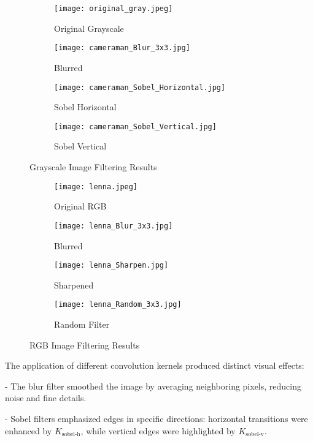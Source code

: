 \documentclass[12pt,a4paper]{article}
\begin{document}
	\begin{figure}[h]
		\centering
		\begin{subfigure}{0.49\linewidth}
			\texttt{[image: original\_gray.jpeg]}
			\caption{Original Grayscale}
		\end{subfigure}
		\begin{subfigure}{0.49\linewidth}
			\texttt{[image: cameraman\_Blur\_3x3.jpg]}
			\caption{Blurred}
		\end{subfigure}
		\begin{subfigure}{0.49\linewidth}
			\texttt{[image: cameraman\_Sobel\_Horizontal.jpg]}
			\caption{Sobel Horizontal}
		\end{subfigure}
		\begin{subfigure}{0.49\linewidth}
			\texttt{[image: cameraman\_Sobel\_Vertical.jpg]}
			\caption{Sobel Vertical}
		\end{subfigure}
		\caption{Grayscale Image Filtering Results}
		\label{fig:original_gray}
	\end{figure}
	\newpage
	\begin{figure}[h]
		\centering
		\begin{subfigure}{0.49\linewidth}
			\texttt{[image: lenna.jpeg]}
			\caption{Original RGB}
		\end{subfigure}
		\begin{subfigure}{0.49\linewidth}
			\texttt{[image: lenna\_Blur\_3x3.jpg]}
			\caption{Blurred}
		\end{subfigure}
		\begin{subfigure}{0.49\linewidth}
			\texttt{[image: lenna\_Sharpen.jpg]}
			\caption{Sharpened}
		\end{subfigure}
		\begin{subfigure}{0.49\linewidth}
			\texttt{[image: lenna\_Random\_3x3.jpg]}
			\caption{Random Filter}
		\end{subfigure}
		\caption{RGB Image Filtering Results}
		\label{fig:lenna}
	\end{figure}
	The application of different convolution kernels produced distinct visual effects:
	
	
	- The blur filter smoothed the image by averaging neighboring pixels, reducing noise and fine details.
	
	- Sobel filters emphasized edges in specific directions: horizontal transitions were enhanced by $K_{\text{sobel-h}}$, while vertical edges were highlighted by $K_{\text{sobel-v}}$.
	
\end{document}
